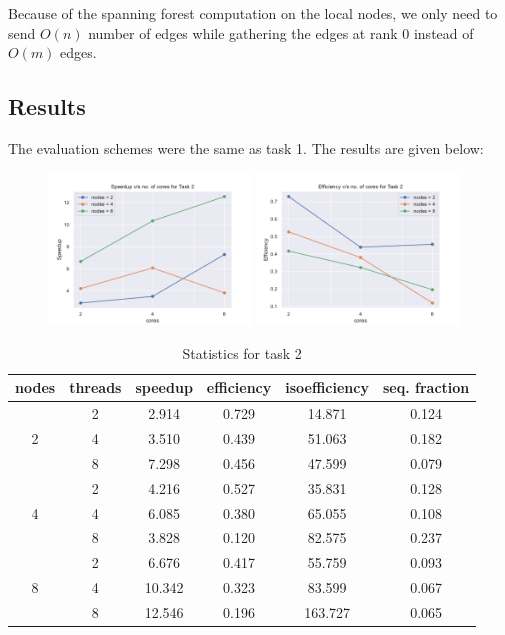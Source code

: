 \documentclass[12pt]{article}
\begin{document}
Because of the spanning forest computation on the local nodes, we only need to
send $O(n)$ number of edges while gathering the edges at rank 0 instead of
$O(m)$ edges.

\subsection*{Results}

The evaluation schemes were the same as task 1. The results are given below:

\begin{figure}[!htbp]
    \centering
    \includegraphics[width=0.48\textwidth]{speedup_t2.pdf}
    \includegraphics[width=0.48\textwidth]{efficiency_t2.pdf}
\end{figure}

\begin{table}[!htbp]
    \centering
\begin{tabular}{|c|c|c|c|c|c|}
    \hline
    nodes & threads & speedup & efficiency & isoefficiency & seq. fraction\\

    \hline
    \multirow{3}{*}{2}
    & 2 & 2.914 & 0.729 & 14.871 & 0.124 \\
    & 4 & 3.510 & 0.439 & 51.063 & 0.182 \\
    & 8 & 7.298 & 0.456 & 47.599 & 0.079 \\

    \hline
    \multirow{3}{*}{4}
    & 2 & 4.216 & 0.527 & 35.831 & 0.128 \\
    & 4 & 6.085 & 0.380 & 65.055 & 0.108 \\
    & 8 & 3.828 & 0.120 & 82.575 & 0.237 \\

    \hline
    \multirow{3}{*}{8}
    & 2 & 6.676 & 0.417 & 55.759 & 0.093 \\
    & 4 & 10.342 & 0.323 & 83.599 & 0.067 \\
    & 8 & 12.546 & 0.196 & 163.727 & 0.065 \\
    \hline
\end{tabular}
\caption{Statistics for task 2}
\end{table}
\end{document}
